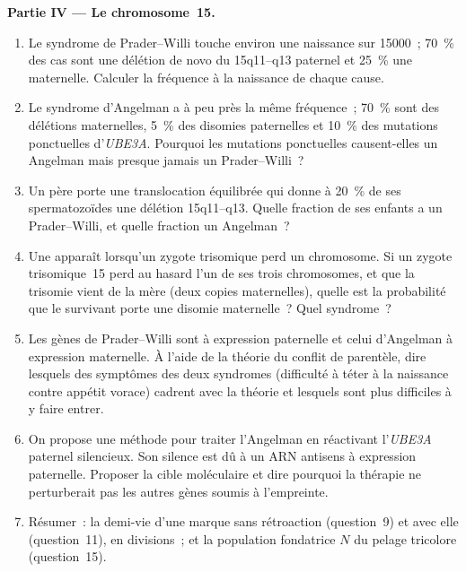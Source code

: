 \begin{problem}
\medskip
\noindent\textbf{Partie IV --- Le chromosome~15.}
\begin{enumerate}[resume]
  \item Le syndrome de Prader--Willi touche environ une naissance sur
        \num{15000}~; \qty{70}{\%} des cas sont une délétion de novo du
        15q11--q13 paternel et \qty{25}{\%} une 
        maternelle. Calculer la fréquence à la naissance de chaque
        cause.
  \item Le syndrome d'Angelman a à peu près la même fréquence~;
        \qty{70}{\%} sont des délétions maternelles, \qty{5}{\%} des
        disomies paternelles et \qty{10}{\%} des mutations ponctuelles
        d'\emph{UBE3A}. Pourquoi les mutations ponctuelles causent-elles
        un Angelman mais presque jamais un Prader--Willi~?
  \item Un père porte une translocation équilibrée qui donne à
        \qty{20}{\%} de ses spermatozoïdes une délétion 15q11--q13.
        Quelle fraction de ses enfants a un Prader--Willi, et quelle
        fraction un Angelman~?
  \item Une  apparaît lorsqu'un zygote trisomique
        perd un chromosome. Si un zygote trisomique~15 perd au hasard
        l'un de ses trois chromosomes, et que la trisomie vient de la
        mère (deux copies maternelles), quelle est la probabilité que
        le survivant porte une disomie maternelle~? Quel syndrome~?
  \item Les gènes de Prader--Willi sont à expression paternelle et
        celui d'Angelman à expression maternelle. À l'aide de la
        théorie du conflit de parentèle, dire lesquels des symptômes
        des deux syndromes (difficulté à téter à la naissance contre
        appétit vorace) cadrent avec la théorie et lesquels sont plus
        difficiles à y faire entrer.
  \item On propose une méthode pour traiter l'Angelman en réactivant
        l'\emph{UBE3A} paternel silencieux. Son silence est dû à un ARN
        antisens à expression paternelle. Proposer la cible moléculaire
        et dire pourquoi la thérapie ne perturberait pas les autres
        gènes soumis à l'empreinte.
  \item Résumer~: la demi-vie d'une marque sans rétroaction
        (question~9) et avec elle (question~11), en divisions~; et la
        population fondatrice $N$ du pelage tricolore (question~15).
\end{enumerate}
\end{problem}
